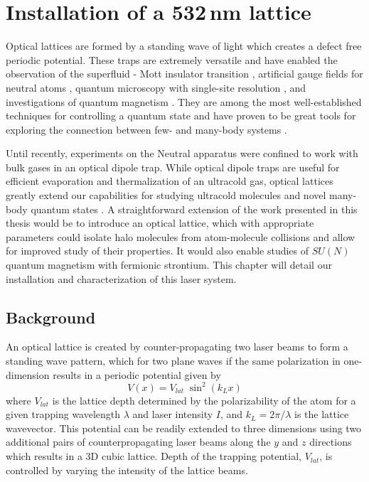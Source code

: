\chapter{Installation of a 532\,nm lattice} \label{ch:chap6}
	
Optical lattices are formed by a standing wave of light which creates a defect free periodic potential.
These traps are extremely versatile and have enabled the observation of the superfluid - Mott insulator transition \cite{gme02}, artificial gauge fields for neutral atoms \cite{Lin2011a}, quantum microscopy with single-site resolution \cite{Bakr2009}, and investigations of quantum magnetism \cite{Hart2015,Greif2015}. 
They are among the most well-established techniques for controlling a quantum state and have proven to be great tools for exploring the connection between few- and many-body systems \cite{bdz08}.

Until recently, experiments on the Neutral apparatus were confined to work with bulk gases in an optical dipole trap.
While optical dipole traps are useful for efficient evaporation and thermalization of an ultracold gas, optical lattices greatly extend our capabilities for studying ultracold molecules and novel many-body quantum states \cite{mtj00,Thalhammer2006,mob06,lsb08,Cappellini2014,zbb14}.
A straightforward extension of the work presented in this thesis would be to introduce an optical lattice, which with appropriate parameters could isolate halo molecules from atom-molecule collisions and allow for improved study of their properties.
It would also enable studies of $SU(N)$ quantum magnetism with fermionic strontium.
This chapter will detail our installation and characterization of this laser system.

\section{Background} \label{sec:latBackground}
An optical lattice is created by counter-propagating two laser beams to form a standing wave pattern, which for two plane waves if the same polarization in one-dimension results in a periodic potential given by 
	\begin{equation} \label{eq:1dlattice}
		 V(x) = V_{lat} \; \sin^2(k_L x)
	\end{equation}
where $V_{lat}$ is the lattice depth determined by the polarizability of the atom for a given trapping wavelength $\lambda$ and laser intensity $I$, and $k_L = 2\pi / \lambda$ is the lattice wavevector.
This potential can be readily extended to three dimensions using two additional pairs of counterpropagating laser beams along the $y$ and $z$ directions which results in a 3D cubic lattice.
Depth of the trapping potential, $V_{lat}$, is controlled by varying the intensity of the lattice beams.

